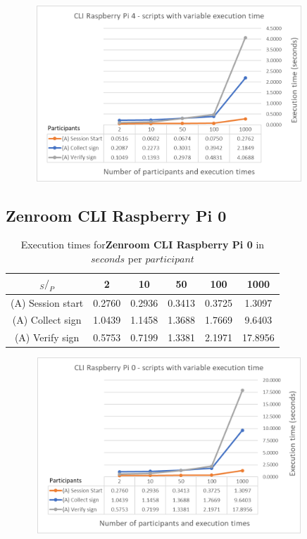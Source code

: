 \documentclass[twocolumn]{article}
\begin{document}
\begin{figure}[h!]
    \centering
    \includegraphics[width=4in, height=2.6in]{graphs/CLIRaspi4.png}
    \label{fig:galaxy}
\end{figure}



\pagebreak
\newpage

\subsection*{Zenroom CLI Raspberry Pi 0}

\begin{table}[h!]
  \begin{center}
    \caption{Execution times for\textbf{Zenroom CLI Raspberry Pi 0} in $seconds$ per $participant$}
      \label{tab:table1}
        \begin{tabular} {c|c|c|c|c|c}
          \toprule
           \textbf{$_S / _P$} & \textbf{2} & \textbf{10} & \textbf{50} & \textbf{100} & \textbf{1000} \\
          \midrule
          (A) Session start & 0.2760 & 0.2936 & 0.3413 & 0.3725 & 1.3097 \\
          (A) Collect sign & 1.0439 & 1.1458 & 1.3688 & 1.7669 & 9.6403 \\
          (A) Verify sign & 0.5753 & 0.7199 & 1.3381 & 2.1971 & 17.8956 \\
      \bottomrule %
    \end{tabular}
  \end{center}
\end{table}

\begin{figure}[h!]
    \centering
    \includegraphics[width=4in, height=2.6in]{graphs/CLIRaspi0.png}
    \label{fig:galaxy}
\end{figure}
\end{document}

